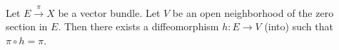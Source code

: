Let $E \xrightarrow{\pi} X$ be a vector bundle. Let $V$ be an open neighborhood of the zero section in $E$. Then there exists a diffeomorphism $h: E \to V$ (into) such that $\pi \circ h = \pi$.
